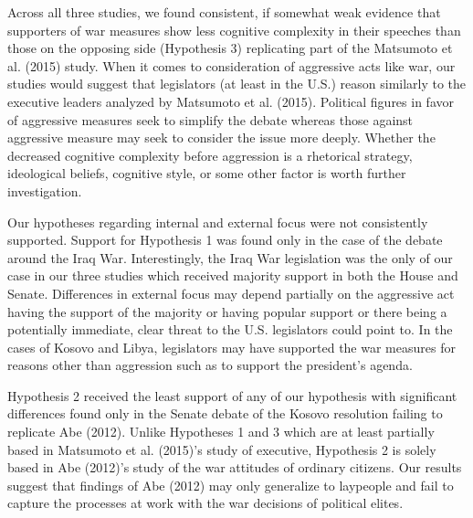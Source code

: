 \documentclass[english,,man,floatsintext]{apa6}
\begin{document}
Across all three studies, we found consistent, if somewhat weak evidence that supporters of war measures show less cognitive complexity in their speeches than those on the opposing side (Hypothesis 3) replicating part of the Matsumoto et al. (2015) study. When it comes to consideration of aggressive acts like war, our studies would suggest that legislators (at least in the U.S.) reason similarly to the executive leaders analyzed by Matsumoto et al. (2015). Political figures in favor of aggressive measures seek to simplify the debate whereas those against aggressive measure may seek to consider the issue more deeply. Whether the decreased cognitive complexity before aggression is a rhetorical strategy, ideological beliefs, cognitive style, or some other factor is worth further investigation.

Our hypotheses regarding internal and external focus were not consistently supported. Support for Hypothesis 1 was found only in the case of the debate around the Iraq War. Interestingly, the Iraq War legislation was the only of our case in our three studies which received majority support in both the House and Senate. Differences in external focus may depend partially on the aggressive act having the support of the majority or having popular support or there being a potentially immediate, clear threat to the U.S. legislators could point to. In the cases of Kosovo and Libya, legislators may have supported the war measures for reasons other than aggression such as to support the president's agenda.

Hypothesis 2 received the least support of any of our hypothesis with significant differences found only in the Senate debate of the Kosovo resolution failing to replicate Abe (2012). Unlike Hypotheses 1 and 3 which are at least partially based in Matsumoto et al. (2015)'s study of executive, Hypothesis 2 is solely based in Abe (2012)'s study of the war attitudes of ordinary citizens. Our results suggest that findings of Abe (2012) may only generalize to laypeople and fail to capture the processes at work with the war decisions of political elites.
\end{document}
